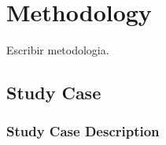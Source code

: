 \chapter{Methodology}

Escribir metodologia.


\section{Study Case}



\subsection{Study Case Description}



    

